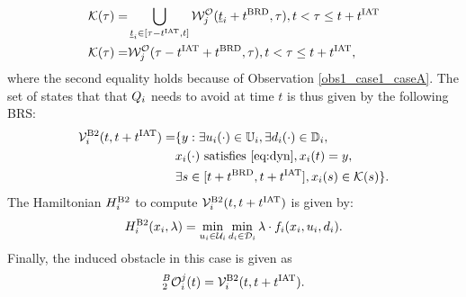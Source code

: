\begin{itemize}[leftmargin=*]
\begin{equation}
\begin{aligned}
\mathcal{K}(\tau) = & \bigcup_{\underline{t}_i \in [\tau-t^\text{IAT}, t]} \mathcal{W}_{j}^{\mathcal{O}}(\underline{t}_i + t^\text{BRD}, \tau), t < \tau \leq t + t^\text{IAT}\\
\mathcal{K}(\tau) = & \mathcal{W}_{j}^{\mathcal{O}}(\tau-t^\text{IAT}+t^\text{BRD}, \tau), t < \tau \leq t + t^\text{IAT},
\end{aligned}
\end{equation}
where the second equality holds because of Observation \ref{obs1_case1_caseA}. The set of states that that $Q_i$ needs to avoid at time $t$ is thus given by the following BRS:  
\begin{equation} \label{eq:ObsBRS_case2_caseB}
\begin{aligned}
\brs^{\text{B2}}_{i}(t, t+\iat) = & \{y: \exists \ctrl_i(\cdot) \in \cfset_i, \exists \dstb_i(\cdot) \in \dfset_i, \\
& \state_i(\cdot) \text{ satisfies \eqref{eq:dyn}}, \state_i(t) = y, \\
& \exists s \in [t+\brd, t+\iat], \state_i(s) \in \mathcal{K}(s) \}.
\end{aligned}
\end{equation}
The Hamiltonian $H^{\text{B2}}_{i}$ to compute $\mathcal{V}^{\text{B2}}_{i}(t, t+t^\text{IAT})$ is given by:
\begin{equation} \label{eqn:BRS_obsham_case2_caseB}
\ham^{\text{B2}}_{i}(\state_i, \costate) = \min_{\ctrl_i \in \cset_i} \min_{\dstb_i \in \dset_i} \costate \cdot f_i (\state_i, \ctrl_i, \dstb_i).
\end{equation}
Finally, the induced obstacle in this case is given as
\begin{equation} \label{eq:intruderObs_case2_caseB}
_2^B\ioset_i^j(t) = \brs^{\text{B2}}_{i}(t, t+\iat).
\end{equation}
\end{itemize}